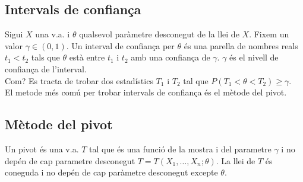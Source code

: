 \documentclass[a4paper]{sciposter}
\begin{document}
\begin{multicols}{3}
\section{Intervals de confiança}
Sigui $X$ una v.a. i $\theta$ qualsevol paràmetre desconegut de la llei de $X$. Fixem un valor $\gamma \in (0,1)$. Un interval de confiança per $\theta$ és una parella de nombres reals $t_1 < t_2$ tals que $\theta$ està entre $t_1$ i $t_2$ amb una confiança de $\gamma$. $\gamma$ és el nivell de confiança de l'interval.\\
Com? Es tracta de trobar dos estadístics $T_1$ i $T_2$ tal que $P(T_1 < \theta < T_2) \geq \gamma$.\\
El metode més comú per trobar intervals de confiança és el mètode del pivot.
\subsection{Mètode del pivot}
Un pivot és una v.a. $T$ tal que és una funció de la mostra i del parametre $\gamma$ i no depén de cap parametre desconegut $T = T(X_1,\dots,X_n;\theta)$. La llei de $T$ és coneguda i no depén de cap paràmetre desconegut excepte $\theta$.

\end{multicols}
\end{document}

